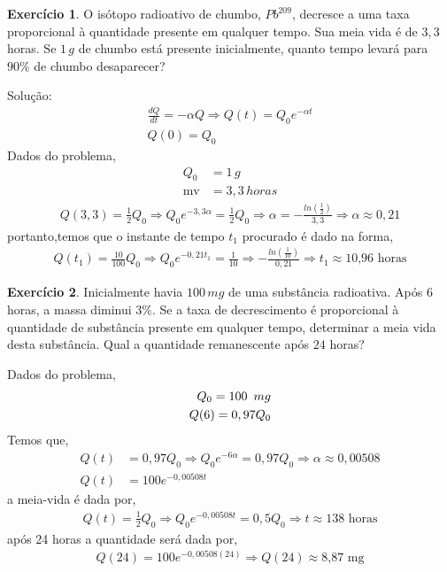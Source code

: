 \documentclass[a4paper,12pt,reqno,natbib]{amsart}
\theoremstyle{definition}
\newtheorem{exercise}{Exerc\'icio}
\begin{document}
\vspace{0.7 cm}

\begin{exercise}
O isótopo radioativo de chumbo, $Pb^{209}$, decresce a uma taxa proporcional à quantidade presente em qualquer tempo. Sua meia vida é de $3,3$ horas. Se $1\,g$ de chumbo está 
presente inicialmente, quanto tempo levará para $90\%$ de chumbo desaparecer?
\end{exercise}
Solu\c c\~ao:
\begin{align*}
	\frac{dQ}{dt} = -\alpha Q \Rightarrow Q(t) = Q_0e^{-\alpha t}\\
	Q(0) = Q_0
\end{align*}
Dados do problema,
\begin{align*}
	Q_0 &= 1 \hspace{2pt}g\\
	\mbox{mv} &= 3,3 \hspace{2pt} horas 
\end{align*}
\begin{align*}
	Q(3,3) = \frac{1}{2}Q_0 \Rightarrow Q_0e^{-3,3\alpha} = \frac{1}{2}Q_0 \Rightarrow
	\alpha = -\frac{ln(\frac{1}{2})}{3,3} \Rightarrow \alpha \approx 0,21
\end{align*}
portanto,temos que o instante de tempo $t_1$ procurado \'e dado na forma,
\begin{align*}
	Q(t_1) = \frac{10}{100}Q_0 \Rightarrow Q_0e^{-0,21 t_1} = \frac{1}{10} \Rightarrow
	-\frac{ln(\frac{1}{10})}{0,21} \Rightarrow \boxed{t_1 \approx \mbox{10,96 horas}} 
\end{align*}
\vspace{0.6 cm}

\begin{exercise}
Inicialmente havia $100\,mg$ de uma substância radioativa. Após $6$ horas, a massa diminui $3\%$. Se a taxa de decrescimento é proporcional à quantidade de substância 
presente em qualquer tempo, determinar a meia vida desta substância. Qual a quantidade remanescente após $24$ horas? 
\end{exercise}
Dados do problema,
\begin{align*}
	Q_0 = 100 \enskip mg\\
	Q(6) = 0,97Q_0
\end{align*}
Temos que,
\begin{align*}
	Q(t)&= 0,97Q_0 \Rightarrow Q_0 e^{-6\alpha} = 0,97Q_0 \Rightarrow \alpha \approx 0,00508 \\
	Q(t) &= 100e^{-0,00508t}
\end{align*}
a meia-vida \'e dada por,
\begin{align*}
	Q(t) = \frac{1}{2}Q_0 \Rightarrow Q_0 e^{-0,00508t} = 0,5Q_0 \Rightarrow \boxed{ t \approx \mbox{138 horas}}
\end{align*}
ap\'os 24 horas a quantidade ser\'a dada por,
\begin{align*}
	Q(24) = 100e^{-0,00508(24)} \Rightarrow \boxed{Q(24) \approx \mbox{8,87 mg}}
\end{align*}
\end{document}

